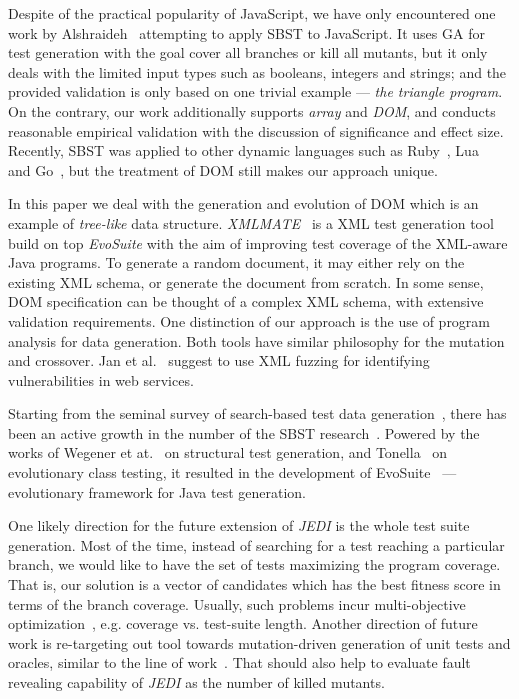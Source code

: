 \documentclass[sigconf,review]{acmart}
\begin{document}
Despite of the practical popularity of JavaScript, we have only encountered one work by Alshraideh~\cite{alshraideh2008complete} attempting to apply SBST to JavaScript. It uses GA for test generation with the goal cover all branches or kill all mutants, but it only deals with the limited input types such as booleans, integers and strings; and the provided validation is only based on one trivial example --- \emph{the triangle program}. On the contrary, our work additionally supports \emph{array} and \emph{DOM}, and conducts reasonable empirical validation with the discussion of significance and effect size. Recently, SBST was applied to other dynamic languages such as Ruby~\cite{mairhofer2011search}, Lua~\cite{wibowo2015unit} and Go~\cite{irawan2016test}, but the treatment of DOM still makes our approach unique.
 
In this paper we deal with the generation and evolution of DOM which is an example of \emph{tree-like} data structure. \emph{XMLMATE}~\cite{havrikov2014xmlmate} is a XML test generation tool build on top \emph{EvoSuite} with the aim of improving test coverage of the XML-aware Java programs. To generate a random document, it may either rely on the  existing XML schema, or generate the document from scratch. In some sense, DOM specification can be thought of a complex XML schema, with extensive validation requirements. One distinction of our approach is the use of program analysis for data generation. Both tools have similar philosophy for the mutation and crossover. Jan et al.~\cite{jan2016automated} suggest to use XML fuzzing for identifying vulnerabilities in web services. 

Starting from the seminal survey of search-based test data generation~\cite{mcminn2004search}, there has been an active growth in the number of the SBST research~\cite{mcminn2011search}. Powered by the works of Wegener et at.~\cite{wegener2001evolutionary} on structural test generation, and Tonella~\cite{tonella2004evolutionary} on evolutionary class testing, it resulted in the development of EvoSuite~\cite{fraser2011evosuite} --- evolutionary framework for Java test generation.

One likely direction for the future extension of \emph{JEDI} is the whole test suite generation. Most of the time, instead of searching for a test reaching a particular branch, we would like to have the set of tests maximizing the program coverage. That is, our solution is a vector of candidates which has the best fitness score in terms of the branch coverage. Usually, such problems incur multi-objective optimization~\cite{lakhotia2007multi}, e.g. coverage vs. test-suite length. Another direction of future work is re-targeting out tool towards mutation-driven generation of unit tests and oracles, similar to the line of work~\cite{fraser2012mutation}. That should also help to evaluate fault revealing capability of \emph{JEDI} as the number of killed mutants. 
\end{document}
